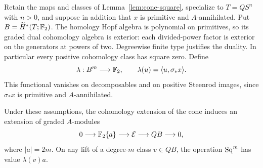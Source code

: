Retain the maps and classes of Lemma~\ref{lem:cone-square},
specialize to \(T=QS^n\) with \(n>0\), and suppose in addition
that \(x\) is primitive and \(A\)-annihilated.
Put \(B=\widetilde H^*(T;\mathbb F_2)\).
The homology Hopf algebra is polynomial on primitives, so its graded
dual cohomology algebra is exterior: each divided-power factor is
exterior on the generators at powers of two. Degreewise finite type
justifies the duality. In particular every positive cohomology class
has square zero. Define
\[
\lambda:B^m\longrightarrow\mathbb F_2,
\qquad \lambda(u)=\langle u,\sigma_*x\rangle.
\]
This functional vanishes on decomposables and on positive Steenrod
images, since \(\sigma_*x\) is primitive and \(A\)-annihilated.

\begin{proposition}\label{prop:cone-extension}
Under these assumptions, the cohomology extension of the cone induces
an extension of graded \(A\)-modules
\begin{equation}\label{eq:indecomposable-cone-extension}
0\longrightarrow\mathbb F_2\{a\}\longrightarrow\mathcal E
\longrightarrow Q B\longrightarrow0,
\end{equation}
where \(|a|=2m\). On any lift of a degree-\(m\) class \(v\in Q B\),
the operation \(\operatorname{Sq}^m\) has value \(\lambda(v)a\).
\end{proposition}

